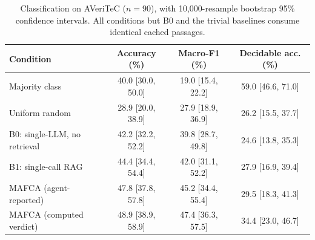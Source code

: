 \begin{table}[t]
\centering
\caption{Classification on AVeriTeC ($n = 90$), with 10,000-resample bootstrap 95\% confidence intervals. All conditions but B0 and the trivial baselines consume identical cached passages.}
\label{tab:cond:class}
\small
\begin{tabular}{@{}lccc@{}}
\toprule
Condition & Accuracy (\%) & Macro-F1 (\%) & Decidable acc. (\%) \\
\midrule
Majority class & 40.0 [30.0, 50.0] & 19.0 [15.4, 22.2] & 59.0 [46.6, 71.0] \\
Uniform random & 28.9 [20.0, 38.9] & 27.9 [18.9, 36.9] & 26.2 [15.5, 37.7] \\
B0: single-LLM, no retrieval & 42.2 [32.2, 52.2] & 39.8 [28.7, 49.8] & 24.6 [13.8, 35.3] \\
B1: single-call RAG & 44.4 [34.4, 54.4] & 42.0 [31.1, 52.2] & 27.9 [16.9, 39.4] \\
MAFCA (agent-reported) & 47.8 [37.8, 57.8] & 45.2 [34.4, 55.4] & 29.5 [18.3, 41.3] \\
MAFCA (computed verdict) & 48.9 [38.9, 58.9] & 47.4 [36.3, 57.5] & 34.4 [23.0, 46.7] \\
\bottomrule
\end{tabular}
\end{table}
